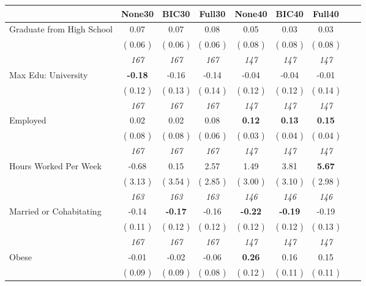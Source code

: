 \begin{tabular}{l c c c c c c c c}
\toprule
 & None30 & BIC30 & Full30 & None40 & BIC40 & Full40 \\
\midrule
Graduate from High School &      0.07 &      0.07 &      0.08 &      0.05 &      0.03 &      0.03 \\
& (     0.06 ) & (     0.06 ) & (     0.06 ) & (     0.08 ) & (     0.08 ) & (     0.08 ) \\
& \textit{ 167 } & \textit{ 167 } & \textit{ 167 } & \textit{ 147 } & \textit{ 147 } & \textit{ 147 } \\
Max Edu: University & \textbf{     -0.18 } &     -0.16 &     -0.14 &     -0.04 &     -0.04 &     -0.01 \\
& (     0.12 ) & (     0.13 ) & (     0.14 ) & (     0.12 ) & (     0.12 ) & (     0.14 ) \\
& \textit{ 167 } & \textit{ 167 } & \textit{ 167 } & \textit{ 147 } & \textit{ 147 } & \textit{ 147 } \\
Employed &      0.02 &      0.02 &      0.08 & \textbf{      0.12 } & \textbf{      0.13 } & \textbf{      0.15 } \\
& (     0.08 ) & (     0.08 ) & (     0.06 ) & (     0.03 ) & (     0.04 ) & (     0.04 ) \\
& \textit{ 167 } & \textit{ 167 } & \textit{ 167 } & \textit{ 147 } & \textit{ 147 } & \textit{ 147 } \\
Hours Worked Per Week &     -0.68 &      0.15 &      2.57 &      1.49 &      3.81 & \textbf{      5.67 } \\
& (     3.13 ) & (     3.54 ) & (     2.85 ) & (     3.00 ) & (     3.10 ) & (     2.98 ) \\
& \textit{ 163 } & \textit{ 163 } & \textit{ 163 } & \textit{ 146 } & \textit{ 146 } & \textit{ 146 } \\
Married or Cohabitating &     -0.14 & \textbf{     -0.17 } &     -0.16 & \textbf{     -0.22 } & \textbf{     -0.19 } &     -0.19 \\
& (     0.11 ) & (     0.12 ) & (     0.12 ) & (     0.12 ) & (     0.12 ) & (     0.13 ) \\
& \textit{ 167 } & \textit{ 167 } & \textit{ 167 } & \textit{ 147 } & \textit{ 147 } & \textit{ 147 } \\
Obese &     -0.01 &     -0.02 &     -0.06 & \textbf{      0.26 } &      0.16 &      0.15 \\
& (     0.09 ) & (     0.09 ) & (     0.08 ) & (     0.12 ) & (     0.11 ) & (     0.11 ) \\

\end{tabular}
